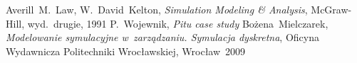 \documentclass[12pt, a4paper, oneside]{mwart} %
\begin{document}
\begin{thebibliography}{9}
Averill~M.~Law, W.~David~Kelton,
\emph{Simulation Modeling \& Analysis},
McGraw-Hill, wyd.~drugie, 1991
P.~Wojewnik, \emph{Pitu case study}
Bożena~Mielczarek, \emph{Modelowanie symulacyjne w~zarządzaniu. Symulacja dyskretna},
Oficyna Wydawnicza Politechniki Wrocławskiej, Wrocław~2009
\end{thebibliography}
\end{document}

